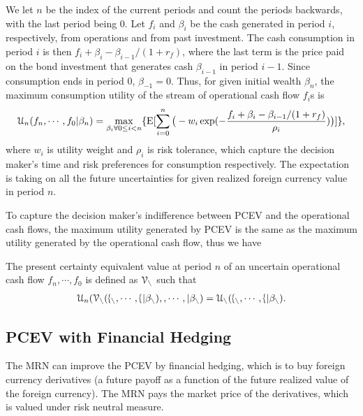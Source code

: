\documentclass[mnsc,nonblindrev,copyedit]{informs2_wz} %
\newcommand{\E}{\mathrm{E}}
\newcommand{\V}{\cal{V}}
\begin{document}
We let $n$ be the index of the current periods and count the periods backwards, with the last period being 0. Let $f_i$ and $\beta_i$ be the cash generated in period $i$, respectively, from operations and from past investment. The cash consumption in period $i$ is then  $f_i + \beta_{i} -\beta_{i-1}/(1+r_f)$, where the last term is the price paid on the bond investment that generates cash $\beta_{i-1}$ in period $i-1$. Since consumption ends in period $0$, $\beta_{-1} =0$. Thus, for given initial wealth $\beta_{n}$,  the maximum consumption utility of the stream of operational cash flow $f_i$s is
\begin{eqnarray} 
     \label{eqn:bondInv-rho}
\mathcal{U}_n(f_n, \cdots, f_0|\beta_{n}) = \max_{\beta_{i} \forall 0 \leq i < n} \{\E [ \sum_{i=0}^n \big{(}-w_i \exp (-\frac{f_i + \beta_{i} -\beta_{i-1}/(1+r_f)}{\rho_i})\big{)}]\},
\end{eqnarray}
where $w_i$ is utility weight and $\rho_i$ is risk tolerance, which capture the decision maker's time and risk preferences for consumption respectively.  The expectation is taking on all the future uncertainties for given realized foreign currency value in period $n$.

To capture the decision maker's indifference between PCEV and the operational cash flows, the maximum utility generated by PCEV is the same as the maximum utility generated by the operational cash flow, thus we have

\begin{definition}
    \label{def:PCEV}
The present certainty equivalent value at period $n$ of an uncertain operational cash flow $f_n, \cdots, f_0$ is defined as $\V_n$ such that
\begin{eqnarray} 
     \label{eqn:PCEV}
\mathcal{U}_n(\V_n(f_n, \cdots, f_0|\beta_{n}), 0, \cdots, 0|\beta_{n}) = \mathcal{U}_n(f_n, \cdots, f_0|\beta_{n}).
\end{eqnarray}
\end{definition}





\subsection{PCEV with Financial Hedging}

The MRN can improve the PCEV by financial hedging, which is to buy foreign currency derivatives (a future payoff as a function of the future realized value of the foreign currency). The MRN pays the market price of the derivatives, which is valued under risk neutral measure.
\end{document}
